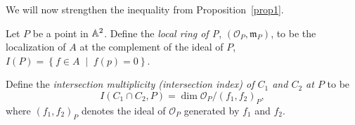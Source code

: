 \documentclass[10pt]{amsart}
\begin{document}
We will now strengthen the inequality from Proposition~\ref{prop1}.  

\begin{defn}\label{localringpoint}
  Let $P$ be a point in $\mathbb{A}^2$.
  Define the {\it local ring of P}, $(\mathcal{O}_P, \mathfrak{m}_P)$, to be the localization of $A$ at the complement of the ideal of $P$, $I(P) = \left\{f \in A \;\middle\vert\; f(p) = 0 \right\}$.
\end{defn}

\begin{defn}\label{intmult}
  Define the {\it intersection multiplicity (intersection index) of $C_1$ and $C_2$ at $P$} to be
  $$I(C_1 \cap C_2, P) = \dim \mathcal{O}_P/(f_1, f_2)_P,$$
  where $(f_1, f_2)_P$ denotes the ideal of $\mathcal{O}_P$ generated by $f_1$ and $f_2$.
\end{defn}
\end{document}
